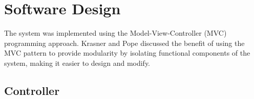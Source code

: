 \section{Software Design}

The system was implemented using the Model-View-Controller (MVC) programming approach. Krasner and Pope \autocite{krasner-pope-88} discussed the benefit of using the MVC pattern to provide modularity by isolating functional components of the system, making it easier to design and modify.


 
 \subsection{Controller}